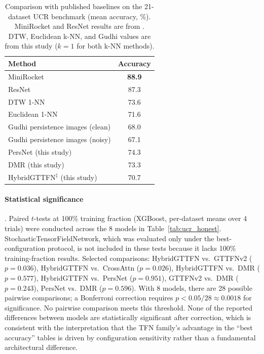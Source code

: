 \documentclass[a4paper,11pt]{article}
\begin{document}
\begin{table}[ht]
\centering
\caption{Comparison with published baselines on the 21-dataset UCR benchmark (mean accuracy, \%). MiniRocket and ResNet results are from \cite{minirocket2021,resnet2019}. DTW, Euclidean k-NN, and Gudhi values are from this study ($k\!=\!1$ for both k-NN methods).}
\label{tab:sota}
\small
\begin{tabular}{lc}
\toprule
Method & Accuracy \\
\midrule
MiniRocket \cite{minirocket2021} & \textbf{88.9} \\
ResNet \cite{resnet2019} & 87.3 \\
DTW 1-NN & 73.6 \\
Euclidean 1-NN & 71.6 \\
\midrule
Gudhi persistence images (clean) & 68.0 \\
Gudhi persistence images (noisy) & 67.1 \\
\midrule
PersNet (this study) & 74.3 \\
DMR (this study) & 73.3 \\
HybridGTTFN$^{\ddagger}$ (this study) & 70.7 \\
\bottomrule
\end{tabular}
\end{table}

\paragraph{Statistical significance} \label{sec:significance}.
Paired $t$-tests at 100\% training fraction (XGBoost, per-dataset means over 4 trials) were conducted across the 8 models in Table~\ref{tab:ucr_honest}. StochasticTensorFieldNetwork, which was evaluated only under the best-configuration protocol, is not included in these tests because it lacks 100\% training-fraction results. Selected comparisons: HybridGTTFN vs.\ GTTFNv2 ($p=0.036$), HybridGTTFN vs.\ CrossAttn ($p=0.026$), HybridGTTFN vs.\ DMR ($p=0.577$), HybridGTTFN vs.\ PersNet ($p=0.951$), GTTFNv2 vs.\ DMR ($p=0.243$), PersNet vs.\ DMR ($p=0.596$).
With 8 models, there are 28 possible pairwise comparisons; a Bonferroni correction requires $p<0.05/28\approx0.0018$ for significance.
No pairwise comparison meets this threshold.
None of the reported differences between models are statistically significant after correction, which is consistent with the interpretation that the TFN family's advantage in the ``best accuracy'' tables is driven by configuration sensitivity rather than a fundamental architectural difference.
\end{document}
